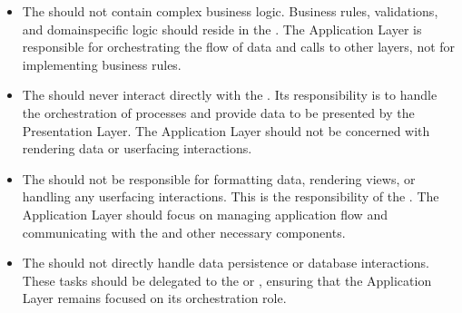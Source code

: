 \documentclass[letterpaper,10pt,english]{sphinxhowto}
\begin{document}
\begin{itemize}
\item {} \begin{description}
\sphinxAtStartPar
The  should not contain complex business logic. Business rules, validations, and domain\sphinxhyphen{}specific logic should reside in the . The Application Layer is responsible for orchestrating the flow of data and calls to other layers, not for implementing business rules.

\end{description}

\item {} \begin{description}
\sphinxAtStartPar
The  should never interact directly with the . Its responsibility is to handle the orchestration of processes and provide data to be presented by the Presentation Layer. The Application Layer should not be concerned with rendering data or user\sphinxhyphen{}facing interactions.

\end{description}

\item {} \begin{description}
\sphinxAtStartPar
The  should not be responsible for formatting data, rendering views, or handling any user\sphinxhyphen{}facing interactions. This is the responsibility of the . The Application Layer should focus on managing application flow and communicating with the  and other necessary components.

\end{description}

\item {} \begin{description}
\sphinxAtStartPar
The  should not directly handle data persistence or database interactions. These tasks should be delegated to the  or , ensuring that the Application Layer remains focused on its orchestration role.


\end{description}
\end{itemize}
\end{document}
